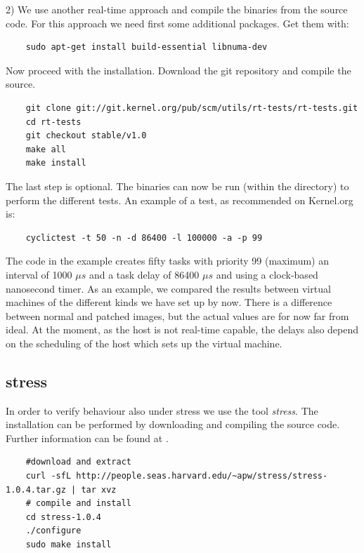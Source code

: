 \documentclass[]{scrartcl}
\begin{document}
2) We use another real-time approach and compile the binaries from the source code.
For this approach we need first some additional packages. Get them with:

\begin{verbatim}
	sudo apt-get install build-essential libnuma-dev
\end{verbatim}

Now proceed with the installation. Download the git repository and compile the source.

\begin{verbatim}
	git clone git://git.kernel.org/pub/scm/utils/rt-tests/rt-tests.git
	cd rt-tests
	git checkout stable/v1.0
	make all
	make install
\end{verbatim}

The last step is optional. The binaries can now be run (within the directory) to perform the different tests. An example of a test, as recommended on Kernel.org is: 

\begin{verbatim}
	cyclictest -t 50 -n -d 86400 -l 100000 -a -p 99
\end{verbatim}

The code in the example creates fifty tasks with priority 99 (maximum) an interval of 1000 $\mu s$ and a task delay of 86400 $\mu s$ and using a clock-based nanosecond timer. 
As an example, we compared the results between virtual machines of the different kinds we have set up by now. There is a difference between normal and patched images, but the actual values are for now far from ideal. At the moment, as the host is not real-time capable, the delays also depend on the scheduling of the host which sets up the virtual machine. 

\subsection{stress}

In order to verify behaviour also under stress we use the tool \textit{stress}. The installation can be performed by downloading and compiling the source code. Further information can be found at \cite{stress01}.

\begin{verbatim}
	#download and extract
	curl -sfL http://people.seas.harvard.edu/~apw/stress/stress-1.0.4.tar.gz | tar xvz
	# compile and install
	cd stress-1.0.4
	./configure
	sudo make install
\end{verbatim}
\end{document}
